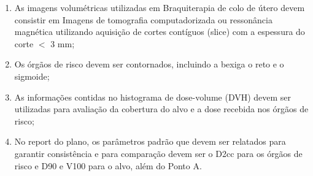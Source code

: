 \documentclass[11pt,a4paper]{article}
\newcounter{exemplo}
\begin{document}
\begin{exemplo}[Braquiterapia]
\begin{itemize}
            \begin{enumerate}[label=\textcolor{CarnationPink}{\arabic*.}]
                \item As imagens volumétricas utilizadas em Braquiterapia de colo de útero devem consistir em Imagens de tomografia computadorizada ou ressonância magnética utilizando aquisição de cortes contíguos (slice) com a espessura do corte $<$ 3 mm;
                \item Os órgãos de risco devem ser contornados, incluindo a bexiga o reto e o sigmoide;
                \item As informações contidas no histograma de dose-volume (DVH) devem ser utilizadas para avaliação da cobertura do alvo e a dose recebida nos órgãos de risco;
                \item No report do plano, os parâmetros padrão que devem ser relatados para garantir consistência e para comparação devem ser o D2cc para os órgãos de risco e D90 e V100 para o alvo, além do Ponto A. 
            \end{enumerate}

    \end{itemize}
\end{exemplo}



\end{document}
